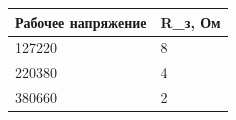 \documentclass[a4paper, 14pt]{extarticle}
\begin{document}
\begin{table}[h]
\centering
\begin{tabular}{@{}ll@{}}
\toprule
Рабочее напряжение & R\_з, Ом \\ \midrule
127220             & 8        \\
220380             & 4        \\
380660             & 2       \\
\bottomrule
\end{tabular}
\end{table}
\end{document}
